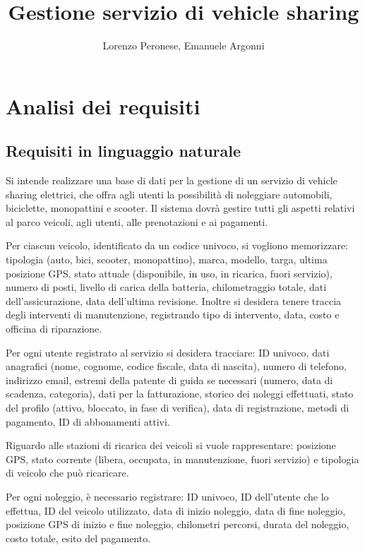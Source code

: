 \documentclass{article}
\title{Gestione servizio di vehicle sharing}
\author{Lorenzo Peronese, Emanuele Argonni}
\begin{document}
\maketitle

\tableofcontents

\newpage

\section{Analisi dei requisiti}

\subsection{Requisiti in linguaggio naturale}

Si intende realizzare una base di dati per la gestione di un servizio di vehicle sharing elettrici, che offra agli utenti la possibilità di noleggiare automobili, biciclette, monopattini e scooter.
Il sistema dovrà gestire tutti gli aspetti relativi al parco veicoli, agli utenti, alle prenotazioni e ai pagamenti.

Per ciascun veicolo, identificato da un codice univoco, si vogliono memorizzare: tipologia (auto, bici, scooter, monopattino), marca, modello, targa, ultima posizione GPS, stato attuale (disponibile, in uso, in ricarica, fuori servizio), numero di posti, livello di carica della batteria, chilometraggio totale, dati dell’assicurazione, data dell’ultima revisione. Inoltre si desidera tenere traccia degli interventi di manutenzione, registrando tipo di intervento, data, costo e officina di riparazione.

Per ogni utente registrato al servizio si desidera tracciare: ID univoco, dati anagrafici (nome, cognome, codice fiscale, data di nascita), numero di telefono, indirizzo email, estremi della patente di guida se necessari (numero, data di scadenza, categoria), dati per la fatturazione, storico dei noleggi effettuati, stato del profilo (attivo, bloccato, in fase di verifica), data di registrazione, metodi di pagamento, ID di abbonamenti attivi.

Riguardo alle stazioni di ricarica dei veicoli si vuole rappresentare: posizione GPS, stato corrente (libera, occupata, in manutenzione, fuori servizio) e tipologia di veicolo che può ricaricare.

Per ogni noleggio, è necessario registrare: ID univoco, ID dell’utente che lo effettua, ID del veicolo utilizzato, data di inizio noleggio, data di fine noleggio, posizione GPS di inizio e fine noleggio, chilometri percorsi, durata del noleggio, costo totale, esito del pagamento.
\end{document}

